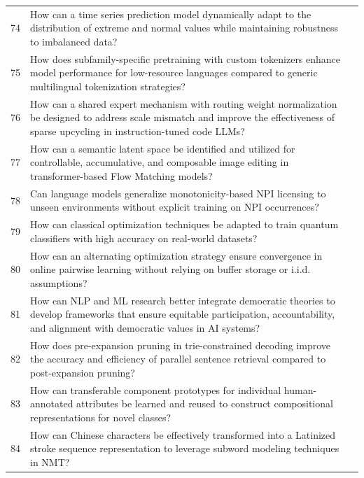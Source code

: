 \begin{longtable}{@{}p{0.5cm}p{7.2cm}p{2.5cm}@{}}
74 & How can a time series prediction model dynamically adapt to the distribution of extreme and normal values while maintaining robustness to imbalanced data? & \cite{10.1609/aaai.v37i7.26045} \\
75 & How does subfamily-specific pretraining with custom tokenizers enhance model performance for low-resource languages compared to generic multilingual tokenization strategies? & \cite{10.18653/v1/2023.findings-eacl.93} \\
76 & How can a shared expert mechanism with routing weight normalization be designed to address scale mismatch and improve the effectiveness of sparse upcycling in instruction-tuned code LLMs? & \cite{10.18653/v1/2024.acl-long.699} \\
77 & How can a semantic latent space be identified and utilized for controllable, accumulative, and composable image editing in transformer-based Flow Matching models? & \cite{10.1609/aaai.v38i3.27998} \\
78 & Can language models generalize monotonicity-based NPI licensing to unseen environments without explicit training on NPI occurrences? & \cite{10.18653/v1/2021.findings-acl.439} \\
79 & How can classical optimization techniques be adapted to train quantum classifiers with high accuracy on real-world datasets? & \cite{10.1609/aaai.v35i18.17941} \\
80 & How can an alternating optimization strategy ensure convergence in online pairwise learning without relying on buffer storage or i.i.d. assumptions? & \cite{10.1609/aaai.v38i10.28955} \\
81 & How can NLP and ML research better integrate democratic theories to develop frameworks that ensure equitable participation, accountability, and alignment with democratic values in AI systems? & \cite{10.18653/v1/2024.emnlp-main.184} \\
82 & How does pre-expansion pruning in trie-constrained decoding improve the accuracy and efficiency of parallel sentence retrieval compared to post-expansion pruning? & \cite{10.18653/v1/2020.acl-main.152} \\
83 & How can transferable component prototypes for individual human-annotated attributes be learned and reused to construct compositional representations for novel classes? & \cite{10.1609/aaai.v37i7.26082} \\
84 & How can Chinese characters be effectively transformed into a Latinized stroke sequence representation to leverage subword modeling techniques in NMT? & \cite{10.18653/v1/2022.emnlp-main.434} \\

\end{longtable}
